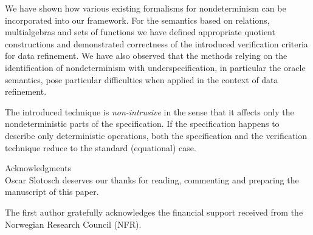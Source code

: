 We have shown how various existing formalisms for nondeterminism can be incorporated into our framework. For the semantics based on relations, multialgebras and sets of functions we have defined appropriate quotient constructions and demonstrated correctness of the introduced verification criteria for data refinement. We have also observed that the methods
relying on the identification of nondeterminism with underspecification, in particular the oracle semantics, pose particular difficulties when applied in the context of data refinement.

The introduced technique is {\em non-intrusive} in the sense that it affects
only the nondeterministic parts of the specification. If the specification
happens to describe only deterministic operations, both the specification and
the verification technique reduce to the standard (equational) case.\\[1ex] 
\begin{REMARK}{Acknowledgments}\\[1ex]
Oscar Slotosch deserves our thanks for reading, commenting and preparing 
the manuscript of this paper.

The first author gratefully acknowledges the financial support received from the Norwegian Research Council (NFR).
\end{REMARK}

